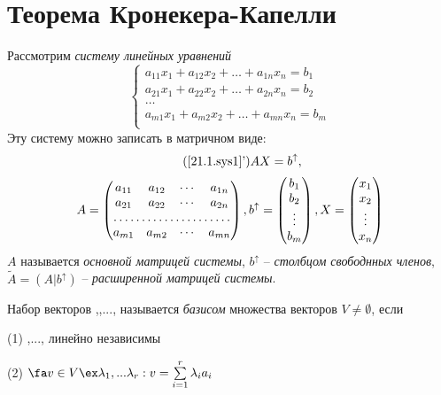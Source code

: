 \section{Теорема Кронекера-Капелли}
  Рассмотрим \textit{систему линейных уравнений}
  \begin{equation}\label{21.1.sys1}
  \left\lbrace\begin{array}{crl}
  a_{11}x_1+a_{12}x_2+\ldots+a_{1n}x_n=b_1\\
  a_{21}x_1+a_{22}x_2+\ldots+a_{2n}x_n=b_2\\
  \ldots \\
  a_{m1}x_1+a_{m2}x_2+\ldots+a_{mn}x_n=b_m\\ 
  \end{array}\right.\end{equation}
  Эту систему можно записать в матричном виде:
  \begin{equation*}\tag{\ref{21.1.sys1}'}
  AX=b^{\uparrow},
  \end{equation*}
  \begin{equation*}
  A=\begin{pmatrix}
    a_{11} & a_{12} & \cdots & a_{1n} \\
    a_{21} & a_{22} & \cdots & a_{2n} \\
    \hdotsfor{4} \\
    a_{m1} & a_{m2} & \cdots & a_{mn} \\
    \end{pmatrix},
  b^\uparrow=\begin{pmatrix}
    b_1 \\ b_2 \\ \vdots \\ b_m \\
    \end{pmatrix},
  X=\begin{pmatrix}
    x_1 \\ x_2 \\ \vdots \\ x_n \\
    \end{pmatrix}
  \end{equation*}
  $A$ называется \textit{основной матрицей системы}, $b^\uparrow$ -- \textit{столбцом свободнных членов}, $\widetilde A = (A|b^\uparrow)$ -- \textit{расширенной матрицей системы}.
  \begin{defn}
  Набор векторов ,,..., называется \textit{базисом} множества векторов $V\neq \emptyset$, если
  
  (1) ,..., линейно независимы
  
  (2) $\fa v \in V \ex \lambda_1,...\lambda_r: v=\sum \limits_{i=1}^r\lambda_ia_i$
  \end{defn}
  
